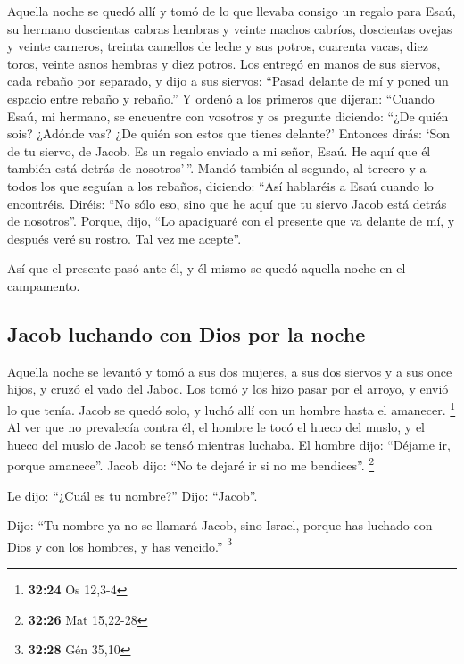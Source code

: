 \begin{paracol}{2}
 Aquella noche se quedó allí y tomó de lo que llevaba
consigo un regalo para Esaú, su hermano  doscientas
cabras hembras y veinte machos cabríos, doscientas ovejas y veinte
carneros,  treinta camellos de leche y sus potros,
cuarenta vacas, diez toros, veinte asnos hembras y diez potros.
 Los entregó en manos de sus siervos, cada rebaño por
separado, y dijo a sus siervos: ``Pasad delante de mí y poned un espacio
entre rebaño y rebaño.''  Y ordenó a los primeros que
dijeran: ``Cuando Esaú, mi hermano, se encuentre con vosotros y os
pregunte diciendo: ``¿De quién sois? ¿Adónde vas? ¿De quién son estos
que tienes delante?'  Entonces dirás: `Son de tu siervo,
de Jacob. Es un regalo enviado a mi señor, Esaú. He aquí que él también
está detrás de nosotros'\,''.  Mandó también al segundo,
al tercero y a todos los que seguían a los rebaños, diciendo: ``Así
hablaréis a Esaú cuando lo encontréis.  Diréis: ``No sólo
eso, sino que he aquí que tu siervo Jacob está detrás de nosotros''.
Porque, dijo, ``Lo apaciguaré con el presente que va delante de mí, y
después veré su rostro. Tal vez me acepte''.

 Así que el presente pasó ante él, y él mismo se quedó
aquella noche en el campamento.

\hypertarget{jacob-luchando-con-dios-por-la-noche}{%
\subsection{Jacob luchando con Dios por la
noche}\label{jacob-luchando-con-dios-por-la-noche}}

 Aquella noche se levantó y tomó a sus dos mujeres, a sus
dos siervos y a sus once hijos, y cruzó el vado del Jaboc.
 Los tomó y los hizo pasar por el arroyo, y envió lo que
tenía.  Jacob se quedó solo, y luchó allí con un hombre
hasta el amanecer. \footnote{\textbf{32:24} Os 12,3-4} 
Al ver que no prevalecía contra él, el hombre le tocó el hueco del
muslo, y el hueco del muslo de Jacob se tensó mientras luchaba.
 El hombre dijo: ``Déjame ir, porque amanece''. Jacob
dijo: ``No te dejaré ir si no me bendices''. \footnote{\textbf{32:26}
  Mat 15,22-28}

 Le dijo: ``¿Cuál es tu nombre?'' Dijo: ``Jacob''.

 Dijo: ``Tu nombre ya no se llamará Jacob, sino Israel,
porque has luchado con Dios y con los hombres, y has vencido.''
\footnote{\textbf{32:28} Gén 35,10}


\end{paracol}
